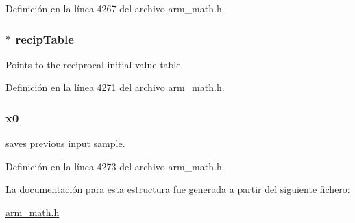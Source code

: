 Definición en la línea 4267 del archivo arm\+\_\+math.\+h.

\subsubsection[{\texorpdfstring{recip\+Table}{recipTable}}]{$\ast$ recip\+Table}\hypertarget{structarm__lms__norm__instance__q15_a39b65b32f68643831304cece01e093bd}{}\label{structarm__lms__norm__instance__q15_a39b65b32f68643831304cece01e093bd}
Points to the reciprocal initial value table. 

Definición en la línea 4271 del archivo arm\+\_\+math.\+h.

\subsubsection[{\texorpdfstring{x0}{x0}}]{ x0}\hypertarget{structarm__lms__norm__instance__q15_a3c975fed200b19723a2ed11efccca6cd}{}\label{structarm__lms__norm__instance__q15_a3c975fed200b19723a2ed11efccca6cd}
saves previous input sample. 

Definición en la línea 4273 del archivo arm\+\_\+math.\+h.



La documentación para esta estructura fue generada a partir del siguiente fichero\+:\begin{DoxyCompactItemize}
\item 
\hyperlink{arm__math_8h}{arm\+\_\+math.\+h}\end{DoxyCompactItemize}

